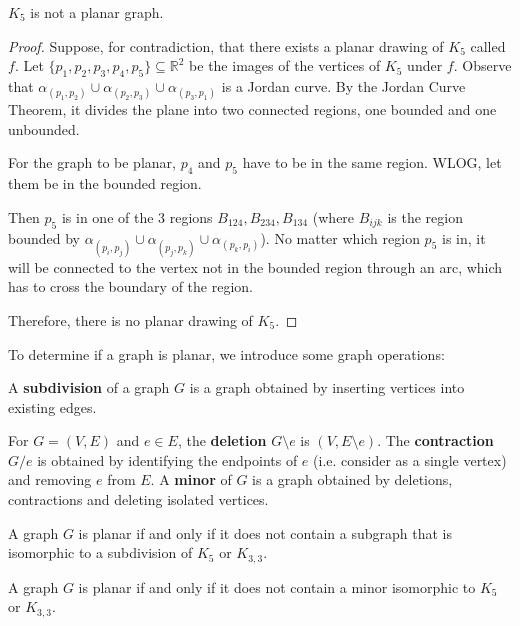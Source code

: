\begin{theorem}
	$K_5$ is not a planar graph.
\end{theorem}
\begin{proof}
	Suppose, for contradiction, that there exists a planar drawing of $K_5$ called $f$. Let $\{p_1, p_2, p_3, p_4, p_5\}\subseteq \mathbb R^2$ be the images of the vertices of $K_5$ under $f$.
	Observe that $\alpha_{(p_1, p_2)}\cup \alpha_{(p_2, p_3)}\cup \alpha_{(p_3, p_1)}$ is a Jordan curve. By the Jordan Curve Theorem, it divides the plane into two connected regions, one bounded and one unbounded.

	For the graph to be planar, $p_4$ and $p_5$ have to be in the same region. WLOG, let them be in the bounded region.

	Then $p_5$ is in one of the 3 regions $B_{124}, B_{234}, B_{134}$ (where $B_{ijk}$ is the region bounded by $\alpha_{(p_i, p_j)}\cup \alpha_{(p_j, p_k)}\cup \alpha_{(p_k, p_i)}$).
	No matter which region $p_5$ is in, it will be connected to the vertex not in the bounded region through an arc, which has to cross the boundary of the region.

	Therefore, there is no planar drawing of $K_5$.
\end{proof}

To determine if a graph is planar, we introduce some graph operations:
\begin{definition}[Subdivision]
	A \textbf{subdivision} of a graph $G$ is a graph obtained by inserting vertices into existing edges.
\end{definition}

\begin{definition}
	For $G=(V,E)$ and $e \in E$, the \textbf{deletion} $G\setminus e$ is $(V, E\setminus e)$.
	The \textbf{contraction} $G/e$ is obtained by identifying the endpoints of $e$ (i.e. consider as a single vertex) and removing $e$ from $E$.
	A \textbf{minor} of $G$ is a graph obtained by deletions, contractions and deleting isolated vertices.
\end{definition}

\begin{theorem}
	A graph $G$ is planar if and only if it does not contain a subgraph that is isomorphic to a subdivision of $K_5$ or $K_{3,3}$.
\end{theorem}

\begin{theorem}
	A graph $G$ is planar if and only if it does not contain a minor isomorphic to $K_5$ or $K_{3,3}$.
\end{theorem}

